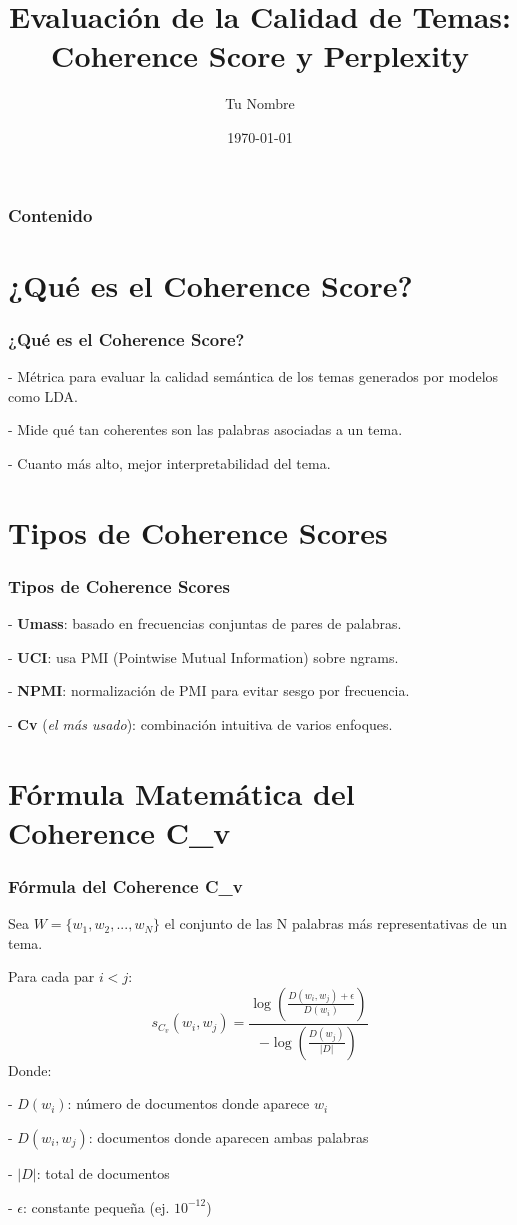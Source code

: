 \documentclass[10pt]{beamer}
\title{Evaluación de la Calidad de Temas: Coherence Score y Perplexity}
\author{Tu Nombre}
\institute{Universidad o Institución}
\date{\today}
\begin{document}
\frame{\titlepage}

\begin{frame}
\frametitle{Contenido}
\tableofcontents
\end{frame}

\section{¿Qué es el Coherence Score?}
\begin{frame}
\frametitle{¿Qué es el Coherence Score?}

    
- Métrica para evaluar la calidad semántica de los temas generados por modelos como LDA.
    
- Mide qué tan coherentes son las palabras asociadas a un tema.
    
- Cuanto más alto, mejor interpretabilidad del tema.

\end{frame}

\section{Tipos de Coherence Scores}
\begin{frame}
\frametitle{Tipos de Coherence Scores}

    
- \textbf{Umass}: basado en frecuencias conjuntas de pares de palabras.
    
- \textbf{UCI}: usa PMI (Pointwise Mutual Information) sobre ngrams.
    
- \textbf{NPMI}: normalización de PMI para evitar sesgo por frecuencia.
    
- \textbf{Cv} (\textit{el más usado}): combinación intuitiva de varios enfoques.

\end{frame}

\section{Fórmula Matemática del Coherence C_v}
\begin{frame}
\frametitle{Fórmula del Coherence C_v}
Sea $ W = \{w_1, w_2, ..., w_N\} $ el conjunto de las N palabras más representativas de un tema.

Para cada par $ i < j $:
$$
s_{C_v}(w_i, w_j) = \frac{\log \left( \frac{D(w_i, w_j) + \epsilon}{D(w_i)} \right)}{-\log \left( \frac{D(w_j)}{|D|} \right)}
$$
Donde:

    
- $ D(w_i) $: número de documentos donde aparece $ w_i $
    
- $ D(w_i, w_j) $: documentos donde aparecen ambas palabras
    
- $ |D| $: total de documentos
    
- $ \epsilon $: constante pequeña (ej. $ 10^{-12} $)

\end{frame}
\end{document}
